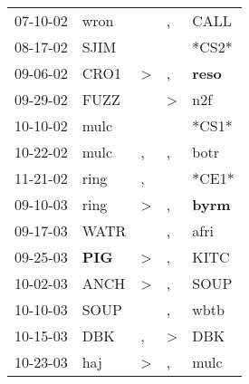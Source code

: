 \begin{supertabular}{p{0.07\textwidth}p{0.06\textwidth}p{0.02\textwidth}p{0.02\textwidth}p{0.06\textwidth}}
          07-10-02\textsuperscript{} &           wron\textsuperscript{} &                  &                , &           CALL\textsuperscript{} \\
          08-17-02\textsuperscript{} &           SJIM\textsuperscript{} &                  &                  &                            *CS2* \\
          09-06-02\textsuperscript{} &           CRO1\textsuperscript{} &     \textgreater &                , &  \textbf{reso\textsuperscript{}} \\
          09-29-02\textsuperscript{} &           FUZZ\textsuperscript{} &                  &     \textgreater &            n2f\textsuperscript{} \\
          10-10-02\textsuperscript{} &           mulc\textsuperscript{} &                  &                  &                            *CS1* \\
          10-22-02\textsuperscript{} &           mulc\textsuperscript{} &                , &                , &           botr\textsuperscript{} \\
          11-21-02\textsuperscript{} &           ring\textsuperscript{} &                , &                  &                            *CE1* \\
          09-10-03\textsuperscript{} &           ring\textsuperscript{} &     \textgreater &                , &  \textbf{byrm\textsuperscript{}} \\
          09-17-03\textsuperscript{} &           WATR\textsuperscript{} &                  &                , &           afri\textsuperscript{} \\
          09-25-03\textsuperscript{} &   \textbf{PIG\textsuperscript{}} &     \textgreater &                , &           KITC\textsuperscript{} \\
          10-02-03\textsuperscript{} &           ANCH\textsuperscript{} &     \textgreater &                , &           SOUP\textsuperscript{} \\
          10-10-03\textsuperscript{} &           SOUP\textsuperscript{} &                  &                , &           wbtb\textsuperscript{} \\
          10-15-03\textsuperscript{} &            DBK\textsuperscript{} &                , &     \textgreater &            DBK\textsuperscript{} \\
          10-23-03\textsuperscript{} &            haj\textsuperscript{} &     \textgreater &                , &           mulc\textsuperscript{} \\

\end{supertabular}
